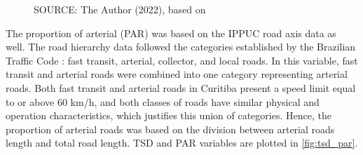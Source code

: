 \begin{figure}[!htbp]
\begin{subfigure}{0.5\textwidth}
    \end{subfigure}
    \label{fig:dis_dsc}
    \par SOURCE: The Author (2022), based on \textcite{IPPUC2018b,IPPUC2021,SETRAN2020}
\end{figure}

The proportion of arterial (PAR) was based on the IPPUC road axis data as well. The road hierarchy data followed the categories established by the Brazilian Traffic Code \cite{Brasil1997}: fast transit, arterial, collector, and local roads. In this variable, fast transit and arterial roads were combined into one category representing arterial roads. Both fast transit and arterial roads in Curitiba present a speed limit equal to or above 60 km/h, and both classes of roads have similar physical and operation characteristics, which justifies this union of categories. Hence, the proportion of arterial roads was based on the division between arterial roads length and total road length. TSD and PAR variables are plotted in \autoref{fig:tsd_par}.

